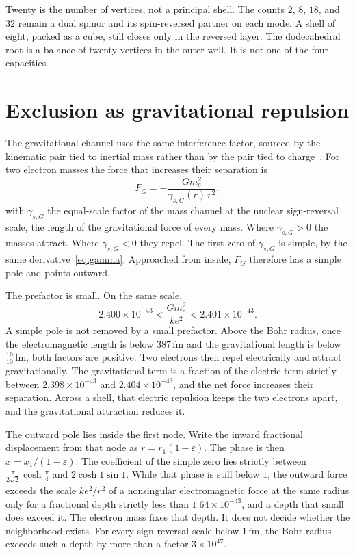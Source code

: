 \documentclass[a4paper]{article}
\begin{document}
Twenty is the number of vertices, not a principal shell. The counts \(2\), \(8\), \(18\), and \(32\) remain a dual spinor and its spin-reversed partner on each mode. A shell of eight, packed as a cube, still closes only in the reversed layer. The dodecahedral root is a balance of twenty vertices in the outer well. It is not one of the four capacities.

\section{Exclusion as gravitational repulsion}
\label{sec:pauli}

The gravitational channel uses the same interference factor, sourced by the kinematic pair tied to inertial mass rather than by the pair tied to charge~\cite{dst-main}. For two electron masses the force that increases their separation is
\begin{equation}
\label{eq:grav}
F_G=-\frac{G m_e^{2}}{\gamma_{s,G}(r)\,r^{2}},
\end{equation}
with \(\gamma_{s,G}\) the equal-scale factor of the mass channel at the nuclear sign-reversal scale, the length of the gravitational force of every mass. Where \(\gamma_{s,G}>0\) the masses attract. Where \(\gamma_{s,G}<0\) they repel. The first zero of \(\gamma_{s,G}\) is simple, by the same derivative~\eqref{eq:gamma}. Approached from inside, \(F_G\) therefore has a simple pole and points outward.

The prefactor is small. On the same scale,
\begin{equation}
\label{eq:ratioG}
2.400\times 10^{-43}<\frac{G m_e^{2}}{k e^{2}}<2.401\times 10^{-43}.
\end{equation}
A simple pole is not removed by a small prefactor. Above the Bohr radius, once the electromagnetic length is below \(387\,\mathrm{fm}\) and the gravitational length is below \(\tfrac{19}{10}\,\mathrm{fm}\), both factors are positive. Two electrons then repel electrically and attract gravitationally. The gravitational term is a fraction of the electric term strictly between \(2.398\times 10^{-43}\) and \(2.404\times 10^{-43}\), and the net force increases their separation. Across a shell, that electric repulsion keeps the two electrons apart, and the gravitational attraction reduces it.

The outward pole lies inside the first node. Write the inward fractional displacement from that node as \(r=r_1(1-\varepsilon)\). The phase is then \(x=x_1/(1-\varepsilon)\). The coefficient of the simple zero lies strictly between \(\frac{\pi}{2\sqrt{2}}\cosh\frac{\pi}{4}\) and \(2\cosh 1\sin 1\). While that phase is still below \(1\), the outward force exceeds the scale \(k e^{2}/r^{2}\) of a nonsingular electromagnetic force at the same radius only for a fractional depth strictly less than \(1.64\times 10^{-43}\), and a depth that small does exceed it. The electron mass fixes that depth. It does not decide whether the neighborhood exists. For every sign-reversal scale below \(1\,\mathrm{fm}\), the Bohr radius exceeds such a depth by more than a factor \(3\times 10^{47}\).
\end{document}
